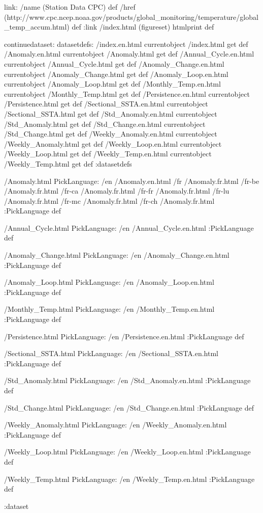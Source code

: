 link:
/name (Station Data CPC) def
/href (http://www.cpc.ncep.noaa.gov/products/global_monitoring/temperature/global_temp_accum.html) def
:link
/index.html {(figureset) htmlprint} def

\begin{ingrid}

continuedataset:
datasetdefs:
/index.en.html currentobject /index.html get def
/Anomaly.en.html currentobject /Anomaly.html get def
/Annual_Cycle.en.html currentobject /Annual_Cycle.html get def
/Anomaly_Change.en.html currentobject /Anomaly_Change.html get def
/Anomaly_Loop.en.html currentobject /Anomaly_Loop.html get def
/Monthly_Temp.en.html currentobject /Monthly_Temp.html get def
/Persistence.en.html currentobject /Persistence.html get def
/Sectional_SSTA.en.html currentobject /Sectional_SSTA.html get def
/Std_Anomaly.en.html currentobject /Std_Anomaly.html get def
/Std_Change.en.html currentobject /Std_Change.html get def
/Weekly_Anomaly.en.html currentobject /Weekly_Anomaly.html get def
/Weekly_Loop.en.html currentobject /Weekly_Loop.html get def
/Weekly_Temp.en.html currentobject /Weekly_Temp.html get def
:datasetdefs

/Anomaly.html {
PickLanguage:
/en /Anomaly.en.html
/fr /Anomaly.fr.html
/fr-be /Anomaly.fr.html
/fr-ca /Anomaly.fr.html
/fr-fr /Anomaly.fr.html
/fr-lu /Anomaly.fr.html
/fr-mc /Anomaly.fr.html
/fr-ch /Anomaly.fr.html
:PickLanguage
} def

/Annual_Cycle.html{
PickLanguage:
/en /Annual_Cycle.en.html
:PickLanguage
} def

/Anomaly_Change.html{
PickLanguage:
/en /Anomaly_Change.en.html
:PickLanguage
} def

/Anomaly_Loop.html{
PickLanguage:
/en /Anomaly_Loop.en.html
:PickLanguage
} def

/Monthly_Temp.html{
PickLanguage:
/en /Monthly_Temp.en.html
:PickLanguage
} def

/Persistence.html{
PickLanguage:
/en /Persistence.en.html
:PickLanguage
} def

/Sectional_SSTA.html{
PickLanguage:
/en /Sectional_SSTA.en.html
:PickLanguage
} def

/Std_Anomaly.html{
PickLanguage:
/en /Std_Anomaly.en.html
:PickLanguage
} def

/Std_Change.html{
PickLanguage:
/en /Std_Change.en.html
:PickLanguage
} def

/Weekly_Anomaly.html{
PickLanguage:
/en /Weekly_Anomaly.en.html
:PickLanguage
} def

/Weekly_Loop.html{
PickLanguage:
/en /Weekly_Loop.en.html
:PickLanguage
} def

/Weekly_Temp.html{
PickLanguage:
/en /Weekly_Temp.en.html
:PickLanguage
} def

:dataset

\end{ingrid}
